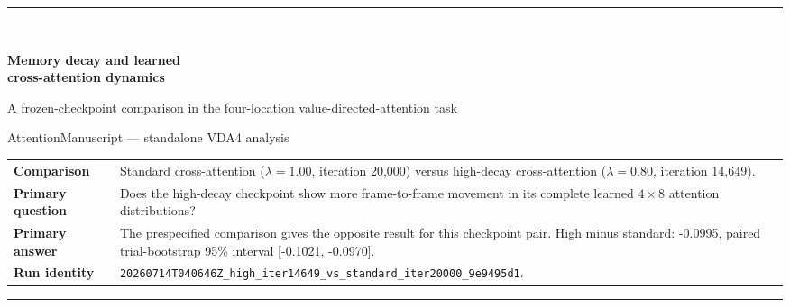 \documentclass[11pt]{article}
\begin{document}
\begin{titlepage}
\thispagestyle{empty}
\vspace*{16mm}
{\color{VdaBlue}\rule{\textwidth}{2.2pt}}\\[10mm]
{\fontsize{27}{32}\selectfont\bfseries Memory decay and learned\\ cross-attention dynamics\par}
\vspace{4mm}
{\fontsize{16}{21}\selectfont A frozen-checkpoint comparison in the four-location value-directed-attention task\par}
\vspace{15mm}
{\large AttentionManuscript --- standalone VDA4 analysis\par}
\vfill
\begin{tabularx}{\textwidth}{@{}p{3.4cm}Y@{}}
\toprule
\textbf{Comparison} & Standard cross-attention ($\lambda=1.00$, iteration 20,000) versus high-decay cross-attention ($\lambda=0.80$, iteration 14,649).\\
\textbf{Primary question} & Does the high-decay checkpoint show more frame-to-frame movement in its complete learned $4\times8$ attention distributions?\\
\textbf{Primary answer} & The prespecified comparison gives the opposite result for this checkpoint pair. High minus standard: -0.0995, paired trial-bootstrap 95\% interval [-0.1021, -0.0970].\\
\textbf{Run identity} & \texttt{20260714T040646Z\_high\_iter14649\_vs\_standard\_iter20000\_9e9495d1}.\\
\bottomrule
\end{tabularx}
\vfill
{\color{VdaBlue}\rule{\textwidth}{2.2pt}}
\end{titlepage}

\begin{abstract}
This analysis tests a precise hypothesis about recurrent visual attention: whether a stronger memory decay is associated with more dynamic learned attention maps. Two preserved VDA4 cross-attention checkpoints were evaluated on shared trial sets under valid and deliberately forced-invalid conditions. ``Activity'' was fixed in advance as frame-to-frame total variation over every query-to-key attention distribution, because total softmax mass is constant by construction. The standard checkpoint averaged 0.5245; the high-decay checkpoint averaged 0.4249. The paired high-minus-standard difference was -0.0995 (95\% trial-bootstrap interval [-0.1021, -0.0970]; $n=256$ matched trial identities, each evaluated under both event conditions). Thus the high-decay checkpoint was less, not more, dynamic under the primary metric. Behavioral curves, image-versus-memory allocation, selectivity, spatial reorientation, response-stratified traces, and raw query-level maps provide convergent description. The comparison remains associational: the high-decay checkpoint was frozen 5,351 iterations earlier, and only one training seed exists per condition.
\end{abstract}
\end{document}
